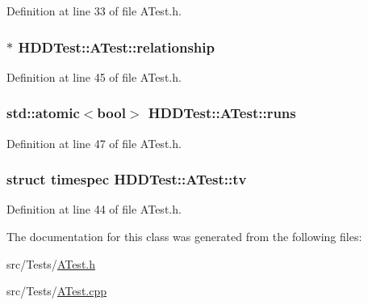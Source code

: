 Definition at line 33 of file A\-Test.\-h.

\hypertarget{class_h_d_d_test_1_1_a_test_a2c3b0b7b9ec6c37f8dce5cceba4b728e}{
\subsubsection[{relationship}]{$\ast$ H\-D\-D\-Test\-::\-A\-Test\-::relationship\hspace{0.3cm}{\ttfamily [protected]}}}\label{class_h_d_d_test_1_1_a_test_a2c3b0b7b9ec6c37f8dce5cceba4b728e}


Definition at line 45 of file A\-Test.\-h.

\hypertarget{class_h_d_d_test_1_1_a_test_a3b5cdf4b9fef9a7c74ec02755a08df24}{
\subsubsection[{runs}]{\setlength{\rightskip}{0pt plus 5cm}std\-::atomic$<$bool$>$ H\-D\-D\-Test\-::\-A\-Test\-::runs\hspace{0.3cm}{\ttfamily [protected]}}}\label{class_h_d_d_test_1_1_a_test_a3b5cdf4b9fef9a7c74ec02755a08df24}


Definition at line 47 of file A\-Test.\-h.

\hypertarget{class_h_d_d_test_1_1_a_test_a2479468580e5e88344aa09eb474021a4}{
\subsubsection[{tv}]{\setlength{\rightskip}{0pt plus 5cm}struct timespec H\-D\-D\-Test\-::\-A\-Test\-::tv\hspace{0.3cm}{\ttfamily [protected]}}}\label{class_h_d_d_test_1_1_a_test_a2479468580e5e88344aa09eb474021a4}


Definition at line 44 of file A\-Test.\-h.



The documentation for this class was generated from the following files\-:\begin{DoxyCompactItemize}
\item 
src/\-Tests/\hyperlink{_a_test_8h}{A\-Test.\-h}\item 
src/\-Tests/\hyperlink{_a_test_8cpp}{A\-Test.\-cpp}\end{DoxyCompactItemize}
